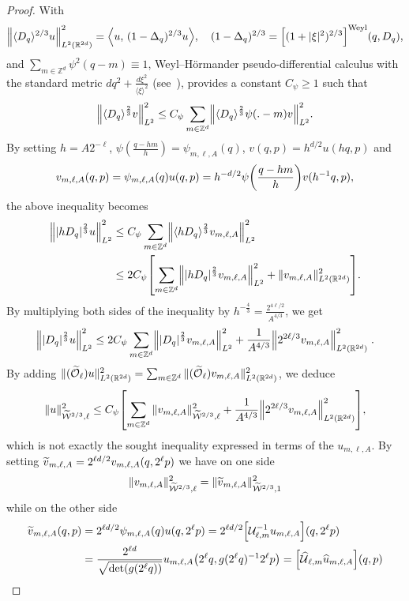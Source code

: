 \documentclass[10pt]{amsart}
\theoremstyle{definition}\newtheorem{defi}[theo]{Definition}\newtheorem{rema}[theo]{Remark}\newtheorem{exam}[theo]{Example}\newtheorem{exem}[theo]{Example}\newtheorem{nota}[theo]{Notation}
\newcommand{\Z}{\mathbb{Z}}
\newcommand{\R}{\mathbb{R}}
\newcommand{\clW}{\mathcal{W}}
\newcommand{\clO}{\mathcal{O}}
\newcommand{\clU}{\mathcal{U}}
\newcommand\norm[1]{\left\lVert#1\right\rVert}
\let\oldtilde\tilde
\renewcommand*{\tilde}[1]{\mathchoice{\widetilde{#1}}{\widetilde{#1}}{\oldtilde{#1}}{\oldtilde{#1}}}
\let\oldhat\hat
\renewcommand*{\hat}[1]{\mathchoice{\widehat{#1}}{\widehat{#1}}{\oldhat{#1}}{\oldhat{#1}}}
\let\originalleft\left
\let\originalright\right
\renewcommand{\left}{\mathopen{}\mathclose\bgroup\originalleft}
\renewcommand{\right}{\aftergroup\egroup\originalright}
\begin{document}
\begin{proof}
With
\[
\norm{\langle D_q\rangle^{2/3}u}_{L^2(\R^{2d})}^2=\left\langle u,\, (1-\Delta_q)^{2/3} u\right\rangle,\quad (1-\Delta_q)^{2/3}=\left[(1+|\xi|^2)^{2/3}\right]^{\text{Weyl}}(q,D_q),
\]
and $\sum_{m\in \Z^{d}} \psi^2(q-m)\equiv 1$, Weyl--H\"ormander pseudo-differential calculus with the standard metric $dq^2+\frac{d\xi^2}{\langle\xi\rangle^2}$ (see~\cite[Chapter~XVIII]{HormIII}), provides a constant $C_{\psi}\geq 1$ such that
\[
\left\| \langle D_q \rangle^{\frac{2}{3}} v \right\|_{L^2}^2 \leq C_{\psi}\sum_{m\in \Z^d}\left\| \langle D_q \rangle^{\frac{2}{3}} \psi(.-m) v \right\|_{L^2}^2 .
\]
By setting $h=A2^{-\ell}$, $\psi(\frac{q-hm}{h}) = \psi_{m,\ell,A }(q)$,
$v(q,p)=h^{d/2}u(hq,p)$ and
\[
v_{m,\ell,A}(q,p)=\psi_{m,\ell,A}(q)u(q,p)=h^{-d/2}\psi\left(\frac{q-hm}{h}\right)v(h^{-1}q,p),
\]
the above inequality becomes
\begin{align*}
\left\| |hD_q|^{\frac{2}{3}} u \right\|_{L^2}^2 &\leq C_{\psi}\sum_{m\in \Z^d}\left\| \langle hD_q \rangle^{\frac{2}{3}} v_{m,\ell,A}\right\|_{L^2}^2
\\
&\leq 2 C_{\psi}\left[\sum_{m\in \Z^d}\left\| |hD_q|^{\frac{2}{3}} v_{m,\ell,A} \right\|_{L^2}^2+\|v_{m,\ell, A}\|_{L^2(\R^{2d})}^2\right].
\end{align*}
By multiplying both sides of the inequality by $ h^{-\frac{4}{3}}=\frac{2^{4\ell/2}}{A^{4/3}}$, we get
\[
\left\| |D_q|^{\frac{2}{3}} u \right\|_{L^2}^2 \leq 2C_{\psi}\sum_{m\in \Z^d}\left\| |D_q|^{\frac{2}{3}} v_{m,\ell,A}\right\|_{L^2}^2 +\frac{1}{A^{4/3}}\left\|2^{2\ell/3}v_{m,\ell, A}\right\|_{L^2(\R^{2d})}^2\;.
\]
By adding $\|(\tilde{\clO}_{\ell})u\|_{L^2(\R^{2d})}^{2}=\sum_{m\in\Z^d} \|(\tilde{\clO}_{\ell})v_{m,\ell,A}\|_{L^2(\R^{2d})}^{2}$, we deduce
\[
\|u\|_{\widetilde{\clW}^{2/3},\ell}^2\leq C_{\psi}\left[\sum_{m\in\Z^d} \|v_{m,\ell,A}\|_{\widetilde{\clW}^{2/3},\ell}^2 +\frac{1}{A^{4/3}}\left\|2^{2\ell/3}v_{m,\ell, A}\right\|_{L^2(\R^{2d})}^2\right],
\]
which is not exactly the sought inequality expressed in terms of the $u_{m,\ell,A}$. By setting $\tilde{v}_{m,\ell,A}=2^{\ell d/2}v_{m,\ell,A}(q, 2^{\ell}p)$ we have on one side
\[
\|v_{m,\ell,A}\|_{\widetilde{\clW}^{2/3},\ell}^2= \|\tilde{v}_{m,\ell,A}\|_{\widetilde{\clW}^{2/3},1}^2
\]
while on the other side
\begin{align*}
\tilde{v}_{m,\ell, A}(q,p)&=2^{\ell d/2}\psi_{m,\ell,A}(q) u(q,2^{\ell}p)=2^{\ell d/2}\left[\clU_{\ell,m}^{-1}u_{m,\ell,A}\right](q, 2^{\ell}p)\\
&=
\frac{2^{\ell d}}{\sqrt{\det (g(2^{\ell}q))}} u_{m,\ell,A}\left(2^{\ell}q,g(2^{\ell}q)^{-1}2^{\ell}p\right) =\left[\hat{\clU}_{\ell,m}\hat{u}_{m,\ell,A}\right](q,p)

\end{align*}
\end{proof}
\end{document}
